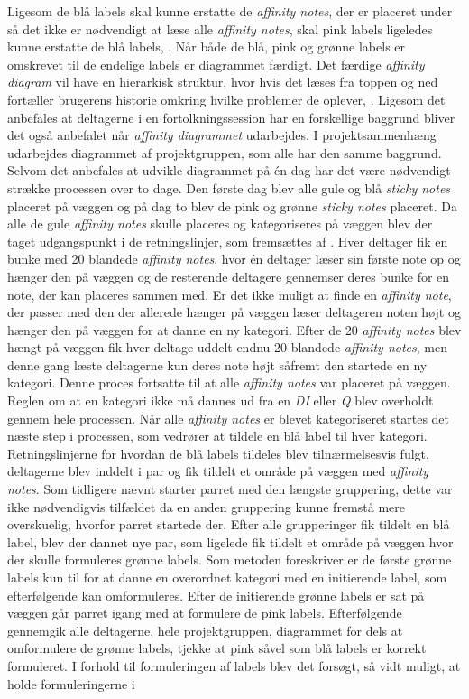 %
Ligesom de blå labels skal kunne erstatte de \textit{affinity notes}, der er placeret under så det ikke er nødvendigt at læse alle \textit{affinity notes}, skal pink labels ligeledes kunne erstatte de blå labels, \parencite[s. 175]{Book:BuildingAnAffinity}. Når både de blå, pink og grønne labels er omskrevet til de endelige labels er diagrammet færdigt. Det færdige \textit{affinity diagram} vil have en hierarkisk struktur, hvor hvis det læses fra toppen og ned fortæller brugerens historie omkring hvilke problemer de oplever, \parencite[s. 25]{PDF:ConsolidationIdeationAffinity}.\blankline
%
Ligesom det anbefales at deltagerne i en fortolkningssession har en forskellige baggrund bliver det også anbefalet når \textit{affinity diagrammet} udarbejdes. I projektsammenhæng udarbejdes diagrammet af projektgruppen, som alle har den samme baggrund. Selvom det anbefales at udvikle diagrammet på én dag har det være nødvendigt strække processen over to dage. Den første dag blev alle gule og blå \textit{sticky notes} placeret på væggen og på dag to blev de pink og grønne \textit{sticky notes} placeret. Da alle de gule \textit{affinity notes} skulle placeres og kategoriseres på væggen blev der taget udgangspunkt i de retningslinjer, som fremsættes af \textcite[s. 168]{Book:BuildingAnAffinity}. Hver deltager fik en bunke med 20 blandede \textit{affinity notes}, hvor én deltager læser sin første note op og hænger den på væggen og de resterende deltagere gennemser deres bunke for en note, der kan placeres sammen med. Er det ikke muligt at finde en \textit{affinity note}, der passer med den der allerede hænger på væggen læser deltageren noten højt og hænger den på væggen for at danne en ny kategori. Efter de 20 \textit{affinity notes} blev hængt på væggen fik hver deltage uddelt endnu 20 blandede \textit{affinity notes}, men denne gang læste deltagerne kun deres note højt såfremt den startede en ny kategori. Denne proces fortsatte til at alle \textit{affinity notes} var placeret på væggen. Reglen om at en kategori ikke må dannes ud fra en \textit{DI} eller \textit{Q} blev overholdt gennem hele processen. Når alle \textit{affinity notes} er blevet kategoriseret startes det næste step i processen, som vedrører at tildele en blå label til hver kategori. Retningslinjerne for hvordan de blå labels tildeles blev tilnærmelsesvis fulgt, deltagerne blev inddelt i par og fik tildelt et område på væggen med \textit{affinity notes}. Som tidligere nævnt starter parret med den længste gruppering, dette var ikke nødvendigvis tilfældet da en anden gruppering kunne fremstå mere overskuelig, hvorfor parret startede der. Efter alle grupperinger fik tildelt en blå label, blev der dannet nye par, som ligelede fik tildelt et område på væggen hvor der skulle formuleres grønne labels. Som metoden foreskriver er de første grønne labels kun til for at danne en overordnet kategori med en initierende label, som efterfølgende kan omformuleres. Efter de initierende grønne labels er sat på væggen går parret igang med at formulere de pink labels. Efterfølgende gennemgik alle deltagerne, hele projektgruppen, diagrammet for dels at omformulere de grønne labels, tjekke at pink såvel som blå labels er korrekt formuleret. I forhold til formuleringen af labels blev det forsøgt, så vidt muligt, at holde formuleringerne i 